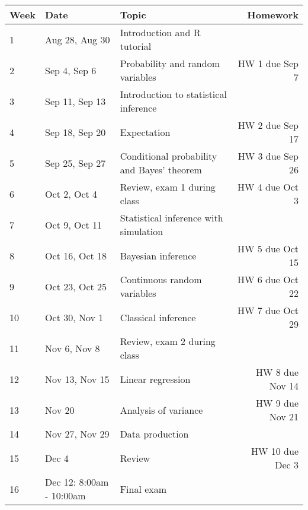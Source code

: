 \documentclass[11pt, a4paper]{article}
\begin{document}
\begin{center}
\begin{tabular}{lllr}
\toprule
\bf Week & \bf Date & \bf Topic & \bf Homework 
\\
\midrule
1    & Aug 28, Aug 30  & Introduction and R tutorial & 
\\
2    & Sep 4, Sep 6 & Probability and random variables & HW 1 due Sep 7
\\
3    & Sep 11, Sep 13 & Introduction to statistical inference
\\
4    & Sep 18, Sep 20 & Expectation & HW 2 due Sep 17
\\
5    & Sep 25, Sep 27 & Conditional probability and Bayes' theorem & HW 3 due Sep 26
\\
6    & Oct 2, Oct 4 & Review, exam 1 during class & HW 4 due Oct 3
\\
7    & Oct 9, Oct 11 & Statistical inference with simulation
\\
8    & Oct 16, Oct 18 & Bayesian inference & HW 5 due Oct 15
\\
9    & Oct 23, Oct 25 & Continuous random variables & HW 6 due Oct 22
\\
10   & Oct 30, Nov 1 & Classical inference  & HW 7 due Oct 29
\\
11   & Nov 6, Nov 8 & Review, exam 2 during class
\\
12   & Nov 13, Nov 15 & Linear regression & HW 8 due Nov 14
\\
13   & Nov 20   & Analysis of variance & HW 9 due Nov 21
\\
14   & Nov 27, Nov 29 & Data production
\\
15   & Dec 4    & Review & HW 10 due Dec 3
\\
16   & Dec 12: 8:00am - 10:00am   & Final exam
\\
\bottomrule
\end{tabular}
\end{center}
\end{document}
